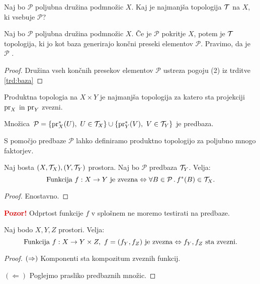 Naj bo $\mathcal{P}$ poljubna družina podmnožic $X$. Kaj je najmanjša topologija $\mathcal{T}$ na $X$, ki vsebuje $\mathcal{P}$?

\begin{trditev}
    Naj bo $\mathcal{P}$ poljubna družina podmnožic $X$. Če je $\mathcal{P}$ pokritje $X$, potem je $\mathcal{T}$ topologija, ki jo kot baza generirajo končni preseki elementov $\mathcal{P}$.
    Pravimo, da je $\mathcal{P}$ .
\end{trditev}

\begin{proof}
    Družina vseh končnih presekov elementov $\mathcal{P}$ ustreza pogoju (2) iz trditve \ref{trd:baza}
\end{proof}

\begin{primer}
    Produktna topologia na $X \times Y$ je najmanjša topologija za katero sta projekciji $\operatorname{pr}_X$ in $\operatorname{pr}_Y$ zvezni. 
    
    Množica~$\mathcal{P} = \left\{\operatorname{pr}_X^{*}(U), \ U \in \mathcal{T}_X\right\} \cup \left\{\operatorname{pr}_Y^{*}(V), \ V \in \mathcal{T}_Y\right\}$ je predbaza. 

    S pomočjo predbaze $\mathcal{P}$ lahko definiramo produktno topologijo za poljubno mnogo faktorjev.
\end{primer}

\begin{trditev}
    Naj bosta $(X, \mathcal{T}_X), (Y, \mathcal{T}_Y)$ prostora. Naj bo $\mathcal{P}$ predbaza $\mathcal{T}_Y$. Velja:
    $$\text{Funkcija } f: X \to Y \text{ je zvezna} \Leftrightarrow \forall B \in \mathcal{P} \,.\, f^{*}(B) \in \mathcal{T}_X.$$
\end{trditev}

\begin{proof}
    Enostavno.
\end{proof}

\textbf{\textcolor{red}{Pozor!}} Odprtost funkcije $f$ v splošnem ne moremo testirati na predbaze.

\begin{trditev}
    Naj bodo $X, Y, Z$ prostori. Velja:
    $$\text{Funkcija } f:X \to Y \times Z, \ f = (f_Y, f_Z) \text{ je zvezna} \Leftrightarrow f_Y, f_Z \text{ sta zvezni}.$$
\end{trditev}

\begin{proof}
    $(\Rightarrow)$ Komponenti sta kompozitum zveznih funkcij.

    $(\Leftarrow)$ Poglejmo prasliko predbaznih množic.
\end{proof}

